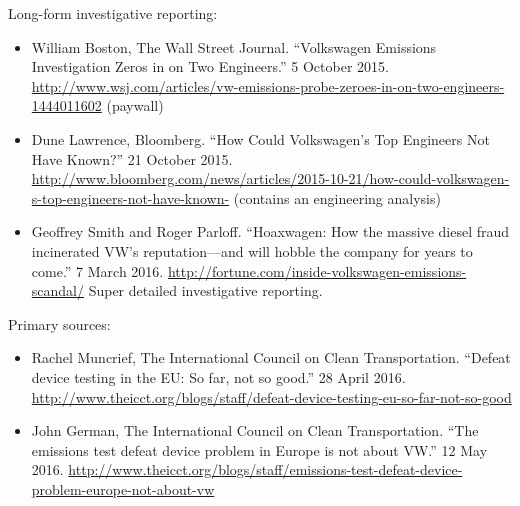 \documentclass[11pt]{article}
\begin{document}
\noindent
Long-form investigative reporting:
\begin{itemize}
\item William Boston, The Wall Street Journal. ``Volkswagen Emissions Investigation Zeros in on Two Engineers.'' 5 October 2015. \url{http://www.wsj.com/articles/vw-emissions-probe-zeroes-in-on-two-engineers-1444011602} (paywall)
\item Dune Lawrence, Bloomberg. ``How Could Volkswagen's Top Engineers Not Have Known?'' 21 October 2015. \url{http://www.bloomberg.com/news/articles/2015-10-21/how-could-volkswagen-s-top-engineers-not-have-known-} (contains an engineering analysis)
\item Geoffrey Smith and Roger Parloff. ``Hoaxwagen: How the massive diesel fraud incinerated VW's reputation---and will hobble the company for years to come.'' 7 March 2016. \url{http://fortune.com/inside-volkswagen-emissions-scandal/} Super detailed investigative reporting.
\end{itemize}

\noindent
Primary sources:
\begin{itemize}
\item Rachel Muncrief, The International Council on Clean Transportation. ``Defeat device testing in the EU: So far, not so good.'' 28 April 2016. \url{http://www.theicct.org/blogs/staff/defeat-device-testing-eu-so-far-not-so-good}
\item John German, The International Council on Clean Transportation. ``The emissions test defeat device problem in Europe is not about VW.'' 12 May 2016. \url{http://www.theicct.org/blogs/staff/emissions-test-defeat-device-problem-europe-not-about-vw}
\end{itemize}
\end{document}

